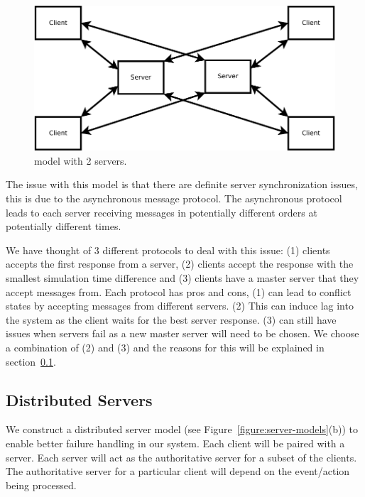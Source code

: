 	\begin{figure}[ht]
		\includegraphics[width=0.95\linewidth]{../images/client-2server-model-crop.pdf}
		\caption{\label{figure:Client-2Server} \clientServer model with 2 servers.}
	\end{figure}
	
	The issue with this model is that there are definite server synchronization issues, this is due to the asynchronous message protocol. The asynchronous protocol leads to each server receiving messages in potentially different orders at potentially different times.
	
	We have thought of 3 different protocols to deal with this issue: (1) clients accepts the first response from a server, (2) clients accept the response with the smallest simulation time difference and (3) clients have a master server that they accept messages from. Each protocol has pros and cons, (1) can lead to conflict states by accepting messages from different servers. (2) This can induce lag into the system as the client waits for the best server response. (3) can still have issues when servers fail as a new master server will need to be chosen. We choose a combination of (2) and (3) and the reasons for this will be explained in section~\ref{subsec:distributed-servers}.
	
	
\subsection{Distributed Servers}
\label{subsec:distributed-servers}

	We construct a distributed server model (see Figure~\ref{figure:server-models}(b)) to enable better failure handling in our system. Each client will be paired with a server. Each server will act as the authoritative server for a subset of the clients. The authoritative server for a particular client will depend on the event/action being processed. 
	
